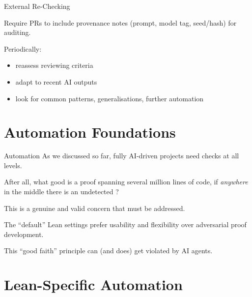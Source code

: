 \documentclass{beamer}
\newcommand{\cverb}[1]{{\color{purple}{\texttt{#1}}}}
\begin{document}
\begin{frame}{External Re-Checking}

Require PRs to include provenance notes (prompt, model tag, seed/hash) for auditing.

\bigskip

Periodically:

\medskip

\begin{itemize}
  \item reassess reviewing criteria
  \medskip
  \item adapt to recent AI outputs
  \medskip
  \item look for common patterns, generalisations, further automation
\end{itemize}
\end{frame}

\section{Automation Foundations}

\begin{frame}{Automation}
As we discussed so far, fully AI-driven projects need checks at all levels.

\bigskip

After all, what good is a proof spanning several million lines of code, if \emph{anywhere} in the middle there is an undetected \cverb{sorry}?

\bigskip

This is a genuine and valid concern that must be addressed.

\bigskip

The ``default'' Lean settings prefer usability and flexibility over adversarial proof development.

\bigskip

This ``good faith'' principle can (and does) get violated by AI agents.
\end{frame}

\section{Lean-Specific Automation}
\end{document}
